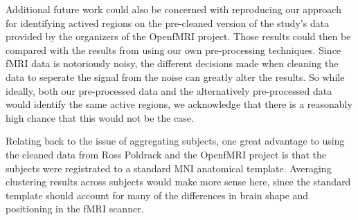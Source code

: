 \par Additional future work could also be concerned with reproducing our 
approach for identifying actived regions on the pre-cleaned version of the 
study's data provided by the organizers of the OpenfMRI project. Those results 
could then be compared with the results from using our own pre-processing 
techniques. Since fMRI data is notoriously noisy, the different decisions made 
when cleaning the data to seperate the signal from the noise can greatly alter 
the results. So while ideally, both our pre-processed data and the 
alternatively pre-processed data would identify the same active regions, we 
acknowledge that there is a reasonably high chance that this would not be the 
case. 

\par Relating back to the issue of aggregating subjects, one great advantage 
to using the cleaned data from Ross Poldrack and the OpenfMRI project is that 
the subjects were registrated to a standard MNI anatomical template. Averaging 
clustering results across subjects would make more sense here, since the 
standard template should account for many of the differences in brain shape 
and positioning in the fMRI scanner. 

